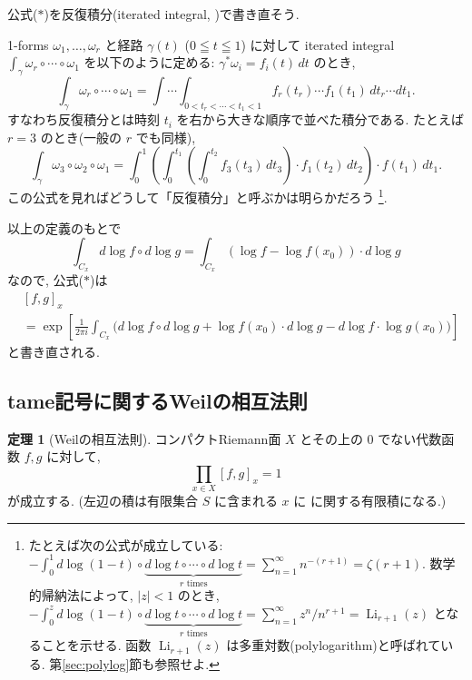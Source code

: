 \documentclass[12pt,twoside]{jarticle}
\theoremstyle{definition} %
\newtheorem{theorem}{定理}
\theoremstyle{definition} %
\theoremstyle{definition} %
\numberwithin{theorem}{section}
\numberwithin{equation}{section}
\numberwithin{figure}{section}
\numberwithin{table}{section}
\newcommand\secref[1]{第\ref{#1}節}
\newcommand\tame[3]{\left[#2,#3\right]_{#1}}
\newcommand\Li{\operatorname{Li}}
\begin{document}
公式($*$)を反復積分(iterated integral, \cite{chen})で書き直そう.

1-forms $\omega_1,\ldots,\omega_r$ と経路 $\gamma(t)$ ($0\leqq t\leqq 1$)
に対して iterated integral $\int_\gamma \omega_r\circ\cdots\circ\omega_1$
を以下のように定める: $\gamma^*\omega_i=f_i(t)\,dt$ のとき,
\[
\int_\gamma \omega_r\circ\cdots\circ\omega_1
=\int\!\cdots\!\int_{0<t_r<\cdots<t_1<1}
 f_r(t_r)\cdots f_1(t_1) \,dt_r\cdots dt_1.
\]
すなわち反復積分とは時刻 $t_i$ を右から大きな順序で並べた積分である.
たとえば $r=3$ のとき(一般の $r$ でも同様),
\[
\int_\gamma \omega_3\circ\omega_2\circ\omega_1
=\int_0^1 \left(\int_0^{t_1} \left(\int_0^{t_2}
 f_3(t_3)\,dt_3\right)\cdot f_1(t_2)\,dt_2\right)\cdot f(t_1)\,dt_1.
\]
この公式を見ればどうして「反復積分」と呼ぶかは明らかだろう%
\footnote{たとえば次の公式が成立している: \(
-\int_0^1 d\log(1-t)\circ\underbrace{d\log t\circ\cdots\circ d\log t}_{\text{$r$ times}}
= \sum_{n=1}^\infty n^{-(r+1)} = \zeta(r+1)
\).
数学的帰納法によって, $|z|<1$ のとき, \(
-\int_0^z d\log(1-t)\circ\underbrace{d\log t\circ\cdots\circ d\log t}_{\text{$r$ times}}
= \sum_{n=1}^\infty z^n/n^{r+1}
= \Li_{r+1}(z)
\) となることを示せる. 函数 $\Li_{r+1}(z)$ は多重対数(polylogarithm)と呼ばれている.
\secref{sec:polylog}も参照せよ.
}.


以上の定義のもとで
\[
\int_{C_x} d\log f\circ d\log g
=\int_{C_x} \left(\log f - \log f(x_0)\right)\cdot d\log g
\]
なので, 公式($*$)は
\begin{align*}
&
\tame{x}{f}{g}
\\ &
=
\exp\left[
\frac{1}{2\pi i}\int_{C_x} \bigl(
  d\log f\circ d\log g + \log f(x_0)\cdot d\log g - d\log f\cdot\log g(x_0)
\bigr)
\right]
\tag{$\ast\ast$}
\end{align*}
と書き直される.


\subsection{tame記号に関するWeilの相互法則}

\begin{theorem}[Weilの相互法則]
コンパクトRiemann面 $X$ とその上の $0$ でない代数函数 $f,g$ に対して,
\[
\prod_{x\in X} \tame{x}{f}{g} = 1
\]
が成立する. (左辺の積は有限集合 $S$ に含まれる $x$ に
に関する有限積になる.)
\end{theorem}
\end{document}

